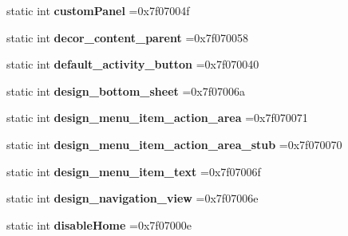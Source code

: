 \begin{DoxyCompactItemize}
static int {\bfseries custom\+Panel} =0x7f07004f
\item 
\mbox{\label{classandroid_1_1support_1_1v7_1_1cardview_1_1R_1_1id_a98161eae2811f6b2c273e24ee6e1d68b}} 
static int {\bfseries decor\+\_\+content\+\_\+parent} =0x7f070058
\item 
\mbox{\label{classandroid_1_1support_1_1v7_1_1cardview_1_1R_1_1id_afb443757ad7c70e1848111a89aa4ace5}} 
static int {\bfseries default\+\_\+activity\+\_\+button} =0x7f070040
\item 
\mbox{\label{classandroid_1_1support_1_1v7_1_1cardview_1_1R_1_1id_a32b08639631910ca6c4ad2f77cfe8a89}} 
static int {\bfseries design\+\_\+bottom\+\_\+sheet} =0x7f07006a
\item 
\mbox{\label{classandroid_1_1support_1_1v7_1_1cardview_1_1R_1_1id_a1d352111642974bac2fa8ab9973d0339}} 
static int {\bfseries design\+\_\+menu\+\_\+item\+\_\+action\+\_\+area} =0x7f070071
\item 
\mbox{\label{classandroid_1_1support_1_1v7_1_1cardview_1_1R_1_1id_adf7231229c945362f88108abf5b5707c}} 
static int {\bfseries design\+\_\+menu\+\_\+item\+\_\+action\+\_\+area\+\_\+stub} =0x7f070070
\item 
\mbox{\label{classandroid_1_1support_1_1v7_1_1cardview_1_1R_1_1id_adf35e207549e9c217c0b2de467c7994c}} 
static int {\bfseries design\+\_\+menu\+\_\+item\+\_\+text} =0x7f07006f
\item 
\mbox{\label{classandroid_1_1support_1_1v7_1_1cardview_1_1R_1_1id_a5014e08a12f448a8c930eea5a772a358}} 
static int {\bfseries design\+\_\+navigation\+\_\+view} =0x7f07006e
\item 
\mbox{\label{classandroid_1_1support_1_1v7_1_1cardview_1_1R_1_1id_adc60594358da3941476512d16515920f}} 
static int {\bfseries disable\+Home} =0x7f07000e

\end{DoxyCompactItemize}
